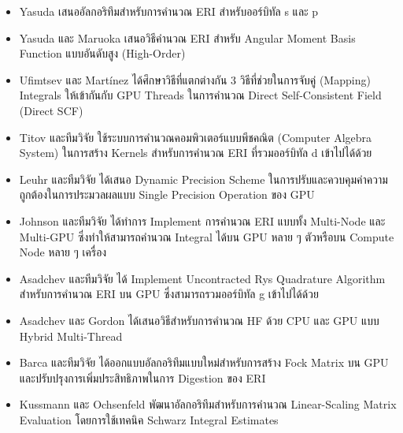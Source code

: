 \begin{itemize}[topsep=0pt,noitemsep]
  \setlength\itemsep{1em}
  \item Yasuda เสนออัลกอริทึมสำหรับการคำนวณ ERI สำหรับออร์บิทัล s และ p\autocite{yasuda2008}

  \item Yasuda และ Maruoka เสนอวิธีคำนวณ ERI สำหรับ Angular Moment Basis Function แบบอันดับสูง (High-Order)%
        \autocite{yasuda2014}

  \item Ufimtsev และ Martínez ได้ศึกษาวิธีที่แตกต่างกัน 3 วิธีที่ช่วยในการจับคู่ (Mapping) Integrals ให้เข้ากันกับ GPU Threads%
        \autocite{ufimtsev2008} ในการคำนวณ Direct Self-Consistent Field (Direct SCF)\autocite{ufimtsev2009}

  \item Titov และทีมวิจัย ใช้ระบบการคำนวณคอมพิวเตอร์แบบพีชคณิต (Computer Algebra System) ในการสร้าง Kernels
        สำหรับการคำนวณ ERI ที่รวมออร์บิทัล d เข้าไปได้ด้วย\autocite{titov2013}

  \item Leuhr และทีมวิจัย ได้เสนอ Dynamic Precision Scheme ในการปรับและควบคุมค่าความถูกต้องในการประมวลผลแบบ Single
        Precision Operation ของ GPU\autocite{luehr2011}

  \item Johnson และทีมวิจัย ได้ทำการ Implement การคำนวณ ERI แบบทั้ง Multi-Node และ Multi-GPU ซึ่งทำให้สามารถคำนวณ
        Integral ได้บน GPU หลาย ๆ ตัวหรือบน Compute Node หลาย ๆ เครื่อง\autocite{johnson2022}

  \item Asadchev และทีมวิจัย ได้ Implement Uncontracted Rys Quadrature Algorithm สำหรับการคำนวณ ERI บน GPU
        ซึ่งสามารถรวมออร์บิทัล g เข้าไปได้ด้วย\autocite{asadchev2010}

  \item Asadchev และ Gordon ได้เสนอวิธีสำหรับการคำนวณ HF ด้วย CPU และ GPU แบบ Hybrid Multi-Thread%
        \autocite{asadchev2012}

  \item Barca และทีมวิจัย ได้ออกแบบอัลกอริทึมแบบใหม่สำหรับการสร้าง Fock Matrix บน GPU\autocite{barca2020}
        และปรับปรุงการเพิ่มประสิทธิภาพในการ Digestion ของ ERI\autocite{barca2021}

  \item Kussmann และ Ochsenfeld พัฒนาอัลกอริทึมสำหรับการคำนวณ Linear-Scaling Matrix Evaluation โดยการใช้เทคนิค
        Schwarz Integral Estimates\autocite{kussmann2013}


\end{itemize}
